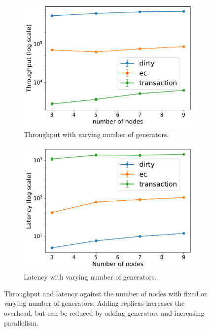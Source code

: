 \begin{figure}[htp]
  \centering
  \begin{subfigure}[t]{0.49\columnwidth}
    \centering
    \includegraphics[width=\columnwidth]{figures/tp_nodes_caelum.pdf}
    \caption{Throughput with varying number of generators.}
    \label{fig:tp nodes caelum}
  \end{subfigure}
    \begin{subfigure}[t]{0.49\columnwidth}
    \centering
    \includegraphics[width=\columnwidth]{figures/lat_nodes_caelum.pdf}
    \caption{Latency with varying number of generators.}
    \label{fig:lat nodes caelum}
  \end{subfigure}
  \caption{Throughput and latency against the number of nodes with fixed or
  varying number of generators. Adding replicas increases the overhead, but can be
  reduced by adding generators and increasing parallelism.}
  \label{fig:nodes caelum}

\end{figure}


